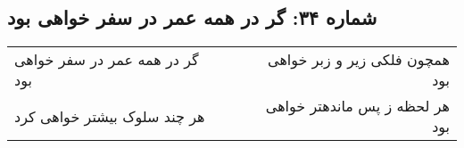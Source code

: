 \begin{center}
\section*{شماره ۳۴: گر در همه عمر در سفر خواهی بود}
\label{sec:034}
\begin{longtable}{l p{0.5cm} r}
گر در همه عمر در سفر خواهی بود
&&
همچون فلکی زیر و زبر خواهی بود
\\
هر چند سلوک بیشتر خواهی کرد
&&
هر لحظه ز پس ماندهتر خواهی بود
\\
\end{longtable}
\end{center}
